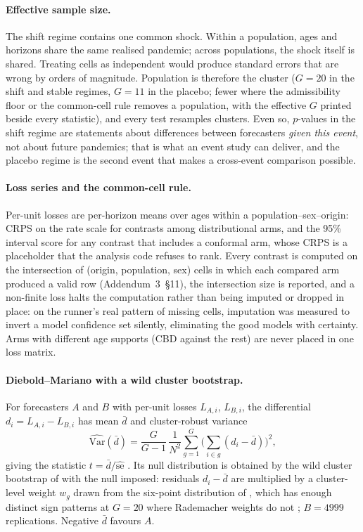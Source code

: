 \paragraph{Effective sample size.} The shift regime contains one common
shock. Within a population, ages and horizons share the same realised
pandemic; across populations, the shock itself is shared. Treating cells as
independent would produce standard errors that are wrong by orders of
magnitude. Population is therefore the cluster ($G=20$ in the shift and
stable regimes, $G=11$ in the placebo; fewer where the admissibility floor
or the common-cell rule removes a population, with the effective $G$
printed beside every statistic), and every test resamples clusters.
Even so, $p$-values in the shift regime are statements about differences
between forecasters \emph{given this event}, not about future pandemics;
that is what an event study can deliver, and the placebo regime is the
second event that makes a cross-event comparison possible.

\paragraph{Loss series and the common-cell rule.} Per-unit losses are
per-horizon means over ages within a population--sex--origin: CRPS on the
rate scale for contrasts among distributional arms, and the 95\% interval
score for any contrast that includes a conformal arm, whose CRPS is a
placeholder that the analysis code refuses to rank. Every contrast is
computed on the intersection of (origin, population, sex) cells in which
each compared arm produced a valid row (Addendum~3~\S11), the intersection
size is reported, and a non-finite loss halts the computation rather than
being imputed or dropped in place: on the runner's real pattern of missing
cells, imputation was measured to invert a model confidence set silently,
eliminating the good models with certainty. Arms with different age
supports (CBD against the rest) are never placed in one loss matrix.

\paragraph{Diebold--Mariano with a wild cluster bootstrap.} For forecasters
$A$ and $B$ with per-unit losses $L_{A,i}$, $L_{B,i}$, the differential
$d_i = L_{A,i}-L_{B,i}$ has mean $\bar d$ and cluster-robust variance
\begin{equation}
  \widehat{\mathrm{Var}}(\bar d) = \frac{G}{G-1}\,\frac{1}{N^2}\sum_{g=1}^{G}
  \Big(\sum_{i\in g}(d_i-\bar d)\Big)^2,
\end{equation}
giving the statistic $t=\bar d/\widehat{\mathrm{se}}$
\citep{diebold1995comparing}. Its null distribution is obtained by the wild
cluster bootstrap of \citet{cameron2008bootstrap} with the null imposed:
residuals $d_i-\bar d$ are multiplied by a cluster-level weight $w_g$ drawn
from the six-point distribution of \citet{webb2023reworking}, which has
enough distinct sign patterns at $G=20$ where Rademacher weights do not
\citep{mackinnon2017wild}; $B=4999$ replications. Negative $\bar d$ favours
$A$.

